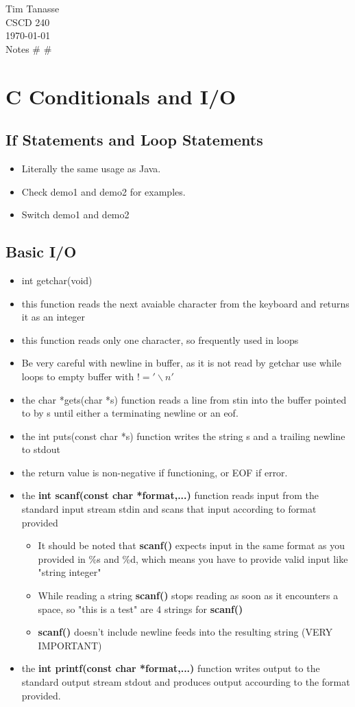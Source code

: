 \documentclass{article}
\begin{document}
\begin{flushright}
  Tim Tanasse\\
  CSCD 240\\
  \today \\
  Notes \# \# \\
\end{flushright}
\section*{C Conditionals and I/O}
\subsection*{If Statements and Loop Statements}
\begin{itemize}
  \item Literally the same usage as Java.
  \item Check demo1 and demo2 for examples.
  \item Switch demo1 and demo2
\end{itemize}
\subsection*{Basic I/O}
\begin{itemize}
  \item int getchar(void)
  \item this function reads the next avaiable character from the keyboard and returns it as an integer
  \item this function reads only one character, so frequently used in loops
  \item Be very careful with newline in buffer, as it is not read by getchar use while loops to empty buffer with $!= '\backslash n'$
  \item the char *gets(char *s) function reads a line from stin into the buffer pointed to by s until either a terminating newline or an eof.
  \item the int puts(const char *s) function writes the string s and a trailing newline to stdout
  \item the return value is non-negative if functioning, or EOF if error.
  \item the \textbf{int scanf(const char *format,...)} function reads input from the standard input stream stdin and scans that input according to format provided
  \begin{itemize}
    \item It should be noted that \textbf{scanf()} expects input in the same format as you provided in \%s and \%d, which means you have to provide valid input like "string integer"
    \item While reading a string \textbf{scanf()} stops reading as soon as it encounters a space, so "this is a test" are 4 strings for \textbf{scanf()}
    \item \textbf{scanf()} doesn't include newline feeds into the resulting string (VERY IMPORTANT)
  \end{itemize}
  \item the \textbf{ int printf(const char *format,...)} function writes output to the standard output stream stdout and produces output accourding to the format provided.
\end{itemize}
\end{document}
